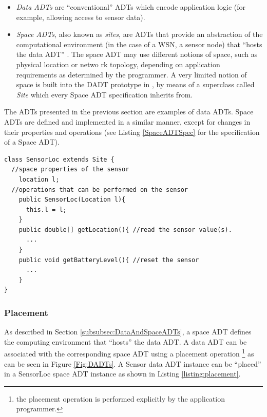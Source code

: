 \begin{itemize}
  \item \emph{Data ADTs} are ``conventional'' ADTs which encode
  application logic (for example, allowing access to sensor data).
  \item \emph{Space ADTs}, also known as \emph{sites}, are ADTs that provide an
  abstraction of the computational environment (in the case of a WSN, a sensor
  node) that ``hosts the data ADT'' \cite{migliavacca_DADT:2006}. The space ADT
  may use different notions of space, such as physical location or netwo
 rk topology, depending on application requirements as determined by the
 programmer. A very limited notion of space is built into the DADT prototype in
 \cite{migliavacca_DADT:2006}, by means of a superclass called \emph{Site} which
 every Space ADT specification inherits from.
\end{itemize}

The ADTs presented in the previous section are examples of data ADTs. Space
ADTs are defined and implemented in a similar manner, except for changes in
their properties and operations (see Listing \ref{SpaceADTSpec} for the
specification of a Space ADT).  
 
 \begin{lstlisting}[frame=trbl, basewidth={0.55em, 0.6em}, captionpos=b, basicstyle=\ttfamily\footnotesize, breaklines, caption = Sensor Space ADT specification (reproduced from \cite{migliavacca_DADT:2006}), label = listing:SpaceADTSpec ]
class SensorLoc extends Site {
  //space properties of the sensor 
	location l;
  //operations that can be performed on the sensor
	public SensorLoc(Location l){
	  this.l = l;
	}
	public double[] getLocation(){ //read the sensor value(s).
	  ...
	}
	public void getBatteryLevel(){ //reset the sensor
	  ...
	}
}
\end{lstlisting}
 
\subsubsection{Placement}
 
As described in Section \ref{subsubsec:DataAndSpaceADTs}, a space ADT defines
the computing environment that ``hosts'' the data ADT. A data ADT can be
associated with the corresponding space ADT using a placement operation
\footnote{the placement operation is
performed explicitly by the application programmer.} as can be seen in Figure \ref{Fig:DADTs}.
A Sensor data ADT
instance can be ``placed'' in a SensorLoc space ADT instance as shown in Listing
\ref{listing:placement}. 

